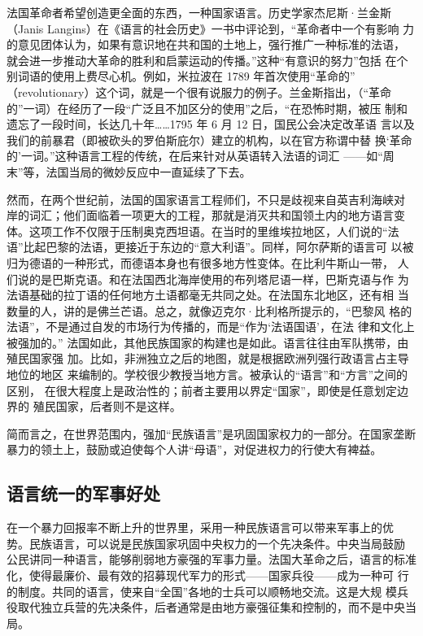 法国革命者希望创造更全面的东西，一种国家语言。历史学家杰尼斯·兰金斯 （Janis Langins）在《语言的社会历史》一书中评论到，“革命者中一个有影响 力的意见团体认为，如果有意识地在共和国的土地上，强行推广一种标准的法语， 就会进一步推动大革命的胜利和启蒙运动的传播。”这种“有意识的努力”包括 在个别词语的使用上费尽心机。例如，米拉波在 1789 年首次使用“革命的” （revolutionary）这个词，就是一个很有说服力的例子。兰金斯指出，（“革命 的”一词）在经历了一段“广泛且不加区分的使用”之后，“在恐怖时期，被压 制和遗忘了一段时间，长达几十年……1795 年 6 月 12 日，国民公会决定改革语 言以及我们的前暴君（即被砍头的罗伯斯庇尔）建立的机构，以在官方称谓中替 换‘革命的’一词。”这种语言工程的传统，在后来针对从英语转入法语的词汇 ——如“周末”等，法国当局的微妙反应中一直延续了下去。

然而，在两个世纪前，法国的国家语言工程师们，不只是歧视来自英吉利海峡对 岸的词汇；他们面临着一项更大的工程，那就是消灭共和国领土内的地方语言变 体。这项工作不仅限于压制奥克西坦语。在当时的里维埃拉地区，人们说的“法 语”比起巴黎的法语，更接近于东边的“意大利语”。同样，阿尔萨斯的语言可 以被归为德语的一种形式，而德语本身也有很多地方性变体。在比利牛斯山一带， 人们说的是巴斯克语。和在法国西北海岸使用的布列塔尼语一样，巴斯克语与作 为法语基础的拉丁语的任何地方土语都毫无共同之处。在法国东北地区，还有相  当数量的人，讲的是佛兰芒语。总之，就像迈克尔·比利格所提示的，“巴黎风 格的法语”，不是通过自发的市场行为传播的，而是“作为‘法语国语’，在法 律和文化上被强加的。” 法国如此，其他民族国家的构建也是如此。语言往往由军队携带，由殖民国家强 加。比如，非洲独立之后的地图，就是根据欧洲列强行政语言占主导地位的地区 来编制的。学校很少教授当地方言。被承认的“语言”和“方言”之间的区别， 在很大程度上是政治性的；前者主要用以界定“国家”，即使是任意划定边界的 殖民国家，后者则不是这样。

简而言之，在世界范围内，强加“民族语言”是巩固国家权力的一部分。在国家垄断暴力的领土上，鼓励或迫使每个人讲“母语”，对促进权力的行使大有裨益。

\subsection{语言统一的军事好处}

在一个暴力回报率不断上升的世界里，采用一种民族语言可以带来军事上的优 势。民族语言，可以说是民族国家巩固中央权力的一个先决条件。中央当局鼓励 公民讲同一种语言，能够削弱地方豪强的军事力量。法国大革命之后，语言的标准化，使得最廉价、最有效的招募现代军力的形式——国家兵役——成为一种可 行的制度。共同的语言，使来自“全国”各地的士兵可以顺畅地交流。这是大规 模兵役取代独立兵营的先决条件，后者通常是由地方豪强征集和控制的，而不是中央当局。

